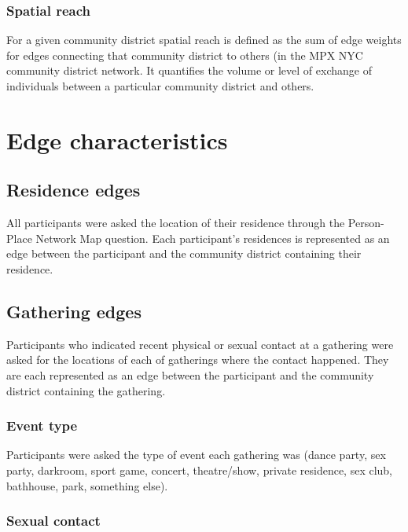 \documentclass[
  letterpaper,
  DIV=11,
  numbers=noendperiod,
  oneside]{scrreprt}
\begin{document}
\hypertarget{spatial-reach}{%
\subsubsection{Spatial reach}\label{spatial-reach}}

For a given community district spatial reach is defined as the sum of
edge weights for edges connecting that community district to others (in
the MPX NYC community district network. It quantifies the volume or
level of exchange of individuals between a particular community district
and others.

\hypertarget{edge-characteristics}{%
\section{Edge characteristics}\label{edge-characteristics}}

\hypertarget{residence-edges}{%
\subsection{Residence edges}\label{residence-edges}}

All participants were asked the location of their residence through the
Person-Place Network Map question. Each participant's residences is
represented as an edge between the participant and the community
district containing their residence.

\hypertarget{gathering-edges}{%
\subsection{Gathering edges}\label{gathering-edges}}

Participants who indicated recent physical or sexual contact at a
gathering were asked for the locations of each of gatherings where the
contact happened. They are each represented as an edge between the
participant and the community district containing the gathering.

\hypertarget{event-type}{%
\subsubsection{Event type}\label{event-type}}

Participants were asked the type of event each gathering was (dance
party, sex party, darkroom, sport game, concert, theatre/show, private
residence, sex club, bathhouse, park, something else).

\hypertarget{sexual-contact}{%
\subsubsection{Sexual contact}\label{sexual-contact}}
\end{document}
